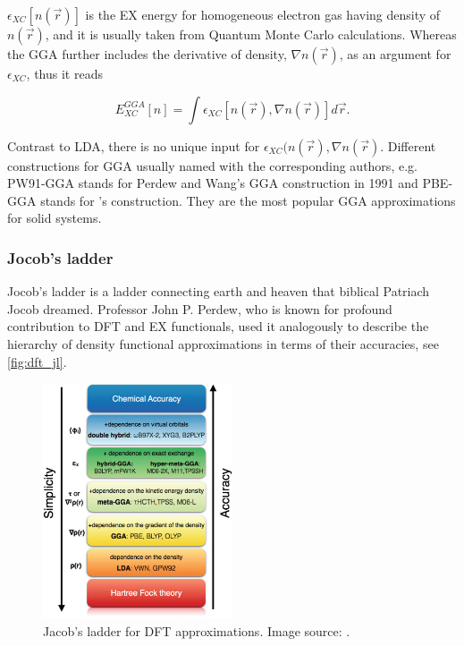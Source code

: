 $\epsilon_{XC}[n(\vec{r})]$ is the EX energy for homogeneous electron gas having density of $n(\vec{r})$, and it is usually taken from Quantum Monte Carlo calculations. Whereas the GGA further includes the derivative of density, $\nabla n(\vec{r})$, as an argument for $\epsilon_{XC}$, thus it reads

\begin{equation}
E_{XC}^{GGA}[n]=\int \epsilon_{XC}[n(\vec{r}),\nabla n(\vec{r})]d\vec{r}.
\end{equation}

Contrast to LDA, there is no unique input for $\epsilon_{XC}(n(\vec{r}),\nabla n(\vec{r})$. Different constructions for GGA usually named with the corresponding authors, e.g. PW91-GGA stands for Perdew and Wang's GGA construction in 1991\cite{Perdew1991,Perdew1992} and PBE-GGA stands for \citet{Perdew1996}'s construction. They are the most popular GGA approximations for solid systems. 

\subsubsection{Jocob's ladder}

Jocob's ladder is a ladder connecting earth and heaven that biblical Patriach Jocob dreamed. Professor John P. Perdew, who is known for profound contribution to DFT and EX functionals, used it analogously to describe the hierarchy of density functional approximations in terms of their accuracies, see \autoref{fig:dft_jl}.  

\begin{figure}[htbp!] 
\centering  
\includegraphics[width=0.5\textwidth]{jacobs.png}
\caption{ Jacob's ladder for DFT approximations. Image source: \cite{Peng2016}.}  
\label{fig:dft_jl}
\end{figure} 

